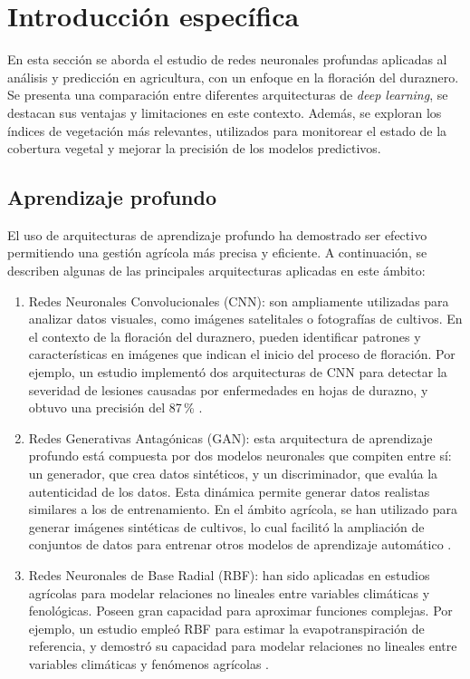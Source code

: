 \chapter{Introducción específica} %

\label{Chapter2}

En esta sección se aborda el estudio de redes neuronales profundas aplicadas al análisis y predicción en 
agricultura, con un enfoque en la floración del duraznero. Se presenta una comparación entre diferentes 
arquitecturas de \textit{deep learning}, se destacan sus ventajas y limitaciones en este contexto. Además, se 
exploran los índices de vegetación más relevantes, utilizados para monitorear el estado de la cobertura 
vegetal y mejorar la precisión de los modelos predictivos.

\section{Aprendizaje profundo}

El uso de arquitecturas de aprendizaje profundo ha demostrado ser efectivo permitiendo 
una gestión agrícola más precisa y eficiente. A continuación, se describen algunas de las principales
arquitecturas aplicadas en este ámbito:


\begin{enumerate}
	\item Redes Neuronales Convolucionales (CNN): son ampliamente utilizadas para analizar datos 
	visuales, como imágenes satelitales o fotografías de cultivos. En el contexto de la floración del duraznero,
	pueden identificar patrones y características en imágenes que indican el inicio del proceso de
	floración. Por ejemplo, un estudio implementó dos arquitecturas de CNN para detectar la severidad de 
	lesiones causadas por enfermedades en hojas de durazno, y obtuvo una precisión del 87\,\% \citep{Rodriguez2023}. 
	\item Redes Generativas Antagónicas (GAN): esta arquitectura de aprendizaje profundo está compuesta 
	por dos modelos neuronales que compiten entre sí: un generador, que crea datos sintéticos, y un 
	discriminador, que evalúa la autenticidad de los datos. Esta dinámica permite generar datos 
	realistas similares a los de entrenamiento. En el ámbito agrícola, se han utilizado para generar imágenes 
	sintéticas de cultivos, lo cual facilitó la ampliación de conjuntos de datos para entrenar otros modelos de aprendizaje 
	automático \citep{Goodfellow2014}.
	\item Redes Neuronales de Base Radial (RBF): han sido aplicadas en estudios agrícolas para modelar relaciones
	 no lineales entre variables climáticas y fenológicas. Poseen gran capacidad para aproximar funciones complejas.
	 Por ejemplo, un estudio empleó RBF para estimar la evapotranspiración de referencia, y demostró su capacidad
	para modelar relaciones no lineales entre variables climáticas y fenómenos agrícolas \citep{Cerv2012}.
\end{enumerate}
	
